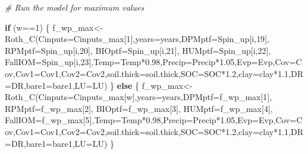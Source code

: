 \documentclass[
  10pt,
  b5paper,
]{book}
\newenvironment{Shaded}{\begin{snugshade}}{\end{snugshade}}
\newcommand{\AttributeTok}[1]{\textcolor[rgb]{0.77,0.63,0.00}{#1}}
\newcommand{\CommentTok}[1]{\textcolor[rgb]{0.56,0.35,0.01}{\textit{#1}}}
\newcommand{\ControlFlowTok}[1]{\textcolor[rgb]{0.13,0.29,0.53}{\textbf{#1}}}
\newcommand{\DecValTok}[1]{\textcolor[rgb]{0.00,0.00,0.81}{#1}}
\newcommand{\FloatTok}[1]{\textcolor[rgb]{0.00,0.00,0.81}{#1}}
\newcommand{\FunctionTok}[1]{\textcolor[rgb]{0.00,0.00,0.00}{#1}}
\newcommand{\NormalTok}[1]{#1}
\newcommand{\OtherTok}[1]{\textcolor[rgb]{0.56,0.35,0.01}{#1}}
\newcommand{\SpecialCharTok}[1]{\textcolor[rgb]{0.00,0.00,0.00}{#1}}
\begin{document}
\begin{Shaded}
\begin{Highlighting}[]
\CommentTok{\# Run the model for maximum values}

\ControlFlowTok{if}\NormalTok{ (w}\SpecialCharTok{==}\DecValTok{1}\NormalTok{) \{}
\NormalTok{f\_wp\_max}\OtherTok{\textless{}{-}}\FunctionTok{Roth\_C}\NormalTok{(}\AttributeTok{Cinputs=}\NormalTok{Cinputs\_max[}\DecValTok{1}\NormalTok{],}\AttributeTok{years=}\NormalTok{years,}\AttributeTok{DPMptf=}\NormalTok{Spin\_up[i,}\DecValTok{19}\NormalTok{], }\AttributeTok{RPMptf=}\NormalTok{Spin\_up[i,}\DecValTok{20}\NormalTok{], }\AttributeTok{BIOptf=}\NormalTok{Spin\_up[i,}\DecValTok{21}\NormalTok{], }\AttributeTok{HUMptf=}\NormalTok{Spin\_up[i,}\DecValTok{22}\NormalTok{], }\AttributeTok{FallIOM=}\NormalTok{Spin\_up[i,}\DecValTok{23}\NormalTok{],}\AttributeTok{Temp=}\NormalTok{Temp}\SpecialCharTok{*}\FloatTok{0.98}\NormalTok{,}\AttributeTok{Precip=}\NormalTok{Precip}\SpecialCharTok{*}\FloatTok{1.05}\NormalTok{,}\AttributeTok{Evp=}\NormalTok{Evp,}\AttributeTok{Cov=}\NormalTok{Cov,}\AttributeTok{Cov1=}\NormalTok{Cov1,}\AttributeTok{Cov2=}\NormalTok{Cov2,}\AttributeTok{soil.thick=}\NormalTok{soil.thick,}\AttributeTok{SOC=}\NormalTok{SOC}\SpecialCharTok{*}\FloatTok{1.2}\NormalTok{,}\AttributeTok{clay=}\NormalTok{clay}\SpecialCharTok{*}\FloatTok{1.1}\NormalTok{,}\AttributeTok{DR=}\NormalTok{DR,}\AttributeTok{bare1=}\NormalTok{bare1,}\AttributeTok{LU=}\NormalTok{LU)}
\NormalTok{\} }\ControlFlowTok{else}\NormalTok{ \{}
\NormalTok{f\_wp\_max}\OtherTok{\textless{}{-}}\FunctionTok{Roth\_C}\NormalTok{(}\AttributeTok{Cinputs=}\NormalTok{Cinputs\_max[w],}\AttributeTok{years=}\NormalTok{years,}\AttributeTok{DPMptf=}\NormalTok{f\_wp\_max[}\DecValTok{1}\NormalTok{], }\AttributeTok{RPMptf=}\NormalTok{f\_wp\_max[}\DecValTok{2}\NormalTok{], }\AttributeTok{BIOptf=}\NormalTok{f\_wp\_max[}\DecValTok{3}\NormalTok{], }\AttributeTok{HUMptf=}\NormalTok{f\_wp\_max[}\DecValTok{4}\NormalTok{], }\AttributeTok{FallIOM=}\NormalTok{f\_wp\_max[}\DecValTok{5}\NormalTok{],}\AttributeTok{Temp=}\NormalTok{Temp}\SpecialCharTok{*}\FloatTok{0.98}\NormalTok{,}\AttributeTok{Precip=}\NormalTok{Precip}\SpecialCharTok{*}\FloatTok{1.05}\NormalTok{,}\AttributeTok{Evp=}\NormalTok{Evp,}\AttributeTok{Cov=}\NormalTok{Cov,}\AttributeTok{Cov1=}\NormalTok{Cov1,}\AttributeTok{Cov2=}\NormalTok{Cov2,}\AttributeTok{soil.thick=}\NormalTok{soil.thick,}\AttributeTok{SOC=}\NormalTok{SOC}\SpecialCharTok{*}\FloatTok{1.2}\NormalTok{,}\AttributeTok{clay=}\NormalTok{clay}\SpecialCharTok{*}\FloatTok{1.1}\NormalTok{,}\AttributeTok{DR=}\NormalTok{DR,}\AttributeTok{bare1=}\NormalTok{bare1,}\AttributeTok{LU=}\NormalTok{LU)}
\NormalTok{\}}


\end{Highlighting}
\end{Shaded}
\end{document}
